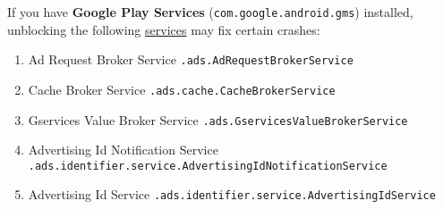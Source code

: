 If you have \textbf{Google Play Services} (\texttt{com.google.android.gms}) installed, unblocking the following
\hyperref[subsubsec:details:servcies]{services} may fix certain crashes:
\begin{enumerate}
    \item Ad Request Broker Service \small{\texttt{.ads.AdRequestBrokerService}}
    \item Cache Broker Service \small{\texttt{.ads.cache.CacheBrokerService}}
    \item Gservices Value Broker Service \small{\texttt{.ads.GservicesValueBrokerService}}
    \item Advertising Id Notification Service \small{\texttt{.ads.identifier.service.AdvertisingIdNotificationService}}
    \item Advertising Id Service \small{\texttt{.ads.identifier.service.AdvertisingIdService}}
\end{enumerate}
